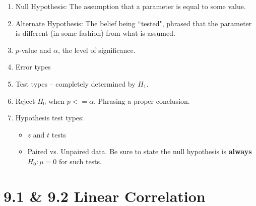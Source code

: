 \documentclass{article}
\begin{document}
\begin{enumerate}
\begin{enumerate}
            \item Null Hypothesis: The assumption that a parameter is equal to some value.
            
            \item Alternate Hypothesis: The belief being ``tested", phrased that the parameter is different (in some fashion) from what is assumed.
            
            \item $p$-value and $\alpha$, the level of significance.
            
            \item Error types
            
            \item Test types -- completely determined by $H_1$.
            
            \item Reject $H_0$ when $p <= \alpha$. Phrasing a proper conclusion.
            
            \item Hypothesis test types:
            
                \begin{itemize}
                
                \item $z$ and $t$ tests
                
                \item Paired vs. Unpaired data. Be sure to state the null hypothesis is \textbf{always} $H_0: \mu = 0$ for such tests.
                
                \end{itemize}
                
        \end{enumerate}
        
\end{enumerate}

\newpage


\section*{9.1 \& 9.2 Linear Correlation}
\end{document}
